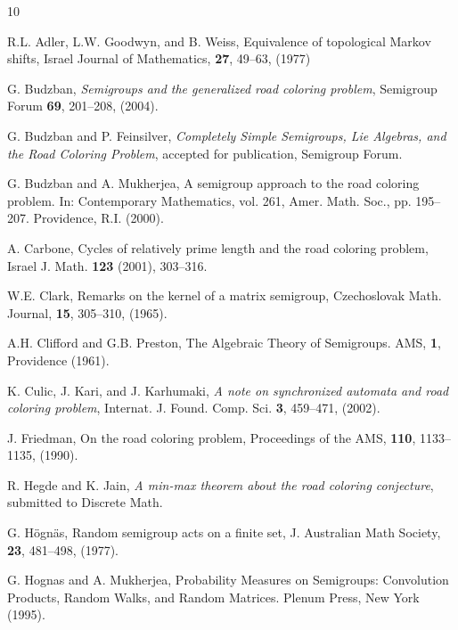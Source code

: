 %
%
%
\begin{thebibliography}{10}


 R.L. Adler, L.W. Goodwyn, and B. Weiss, 
Equivalence of topological Markov shifts, 
Israel Journal of Mathematics, \textbf{27}, 49--63, (1977)

G. Budzban,
\textit{Semigroups and the generalized road coloring problem},
Semigroup Forum \textbf{69}, 201--208, (2004).


G. Budzban and P. Feinsilver,
\textit{Completely Simple Semigroups, Lie Algebras, and the Road Coloring Problem}, 
accepted for publication, Semigroup Forum.

 G. Budzban and A. Mukherjea, 
A semigroup approach to the road coloring problem.
In: Contemporary Mathematics, vol. 261, 
Amer. Math. Soc., pp. 195--207. Providence, R.I. (2000).

 A. Carbone, Cycles of relatively prime length and the road coloring problem, Israel J. Math. \textbf{123} (2001), 303--316.

 W.E. Clark, 
Remarks on the kernel of a matrix semigroup, 
Czechoslovak Math. Journal, \textbf{15}, 305--310, (1965).

 A.H. Clifford and G.B. Preston, 
The Algebraic Theory of Semigroups. AMS, \textbf{1}, 
Providence (1961).

K. Culic, J. Kari, and J. Karhumaki,
\textit{A note on synchronized automata and road coloring problem},
Internat. J. Found. Comp. Sci. \textbf{3}, 459--471, (2002).

 J. Friedman,  
On the road coloring problem, 
Proceedings of the AMS, \textbf{110}, 1133--1135, (1990).

R. Hegde and K. Jain,
\textit{A min-max theorem about the road coloring conjecture},
submitted to Discrete Math.

 G. H\"ogn\"as, 
Random semigroup acts on a finite set, 
J. Australian Math Society, \textbf{23}, 481--498, (1977).

 G. Hognas and A. Mukherjea, 
Probability Measures on Semigroups: Convolution Products, Random Walks, and Random Matrices. Plenum Press, New York (1995).


\end{thebibliography}
